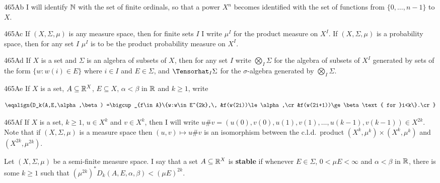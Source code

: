 \spheader 465Ab I will identify $\Bbb N$ with the set of finite
ordinals, so that a power $X^n$ becomes identified with the set of
functions from $\{0,\ldots,n-1\}$ to $X$.

\spheader 465Ac If $(X,\Sigma,\mu)$ is any measure space, then for
finite sets $I$ I write
$\mu^I$ for the product measure on $X^I$.      If
$(X,\Sigma,\mu)$ is a probability space, then for any set $I\,\,\mu^I$
is to be the product probability measure on $X^I$.

\spheader 465Ad   If $X$ is a set and $\Sigma$ is an algebra of
subsets of $X$, then for any set $I$ write $\bigotimes_I\Sigma$ for the
algebra of subsets of $X^I$ generated by sets of the form
$\{w:w(i)\in E\}$ where $i\in I$ and $E\in\Sigma$, and
$\Tensorhat_I\Sigma$ for the
$\sigma$-algebra generated by $\bigotimes_I\Sigma$.

\spheader 465Ae   If $X$ is a set,
$A\subseteq\Bbb R^X$, $E\subseteq X$, $\alpha<\beta$ in $\Bbb R$ and $k\ge 1$, write

$$\eqalign{D_k(A,E,\alpha,\beta)
=\bigcup_{f\in A}\{w:w\in E^{2k},\,
&f(w(2i))\le\alpha,\cr
&f(w(2i+1))\ge\beta\text{ for }i<k\}.\cr}$$

\spheader 465Af   If $X$ is a set, $k\ge 1$, $u\in X^k$ and $v\in X^k$, then I
will write $u\#v=(u(0),v(0),u(1),v(1),\ldots,u(k-1),v(k-1))\in X^{2k}$.
Note that if $(X,\Sigma,\mu)$ is a measure space then
$(u,v)\mapsto u\#v$ is an isomorphism between the c.l.d.\ product
$(X^k,\mu^k)\times(X^k,\mu^k)$ and
$(X^{2k},\mu^{2k})$.


 Let $(X,\Sigma,\mu)$ be a semi-finite measure
space.    I say that a
set $A\subseteq\Bbb R^X$ is {\bf stable} if whenever $E\in\Sigma$,
$0<\mu
E<\infty$ and $\alpha<\beta$ in $\Bbb R$, there is some $k\ge 1$ such
that $(\mu^{2k})^*D_k(A,E,\alpha,\beta)<(\mu E)^{2k}$.

